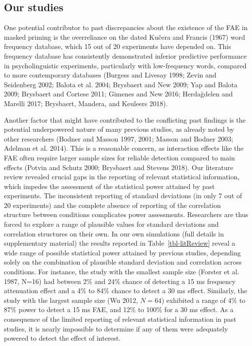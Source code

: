 \documentclass[
]{interact}
\begin{document}
\subsection{Our studies}\label{our-studies}

One potential contributor to past discrepancies about the existence of
the FAE in masked priming is the overreliance on the dated Kučera and
Francis (1967) word frequency database, which 15 out of 20 experiments
have depended on. This frequency database has consistently demonstrated
inferior predictive performance in psycholinguistic experiments,
particularly with low-frequency words, compared to more contemporary
databases (Burgess and Livesay 1998; Zevin and Seidenberg 2002; Balota
et al. 2004; Brysbaert and New 2009; Yap and Balota 2009; Brysbaert and
Cortese 2011; Gimenes and New 2016; Herdağdelen and Marelli 2017;
Brysbaert, Mandera, and Keuleers 2018).

Another factor that might have contributed to the conflicting past
findings is the potential underpowered nature of many previous studies,
as already noted by other researchers (Bodner and Masson 1997, 2001;
Masson and Bodner 2003; Adelman et al. 2014). This is a reasonable
concern, as interaction effects like the FAE often require larger sample
sizes for reliable detection compared to main effects (Potvin and Schutz
2000; Brysbaert and Stevens 2018). Our literature review revealed
crucial gaps in the reporting of relevant statistical information, which
impedes the assessment of the statistical power attained by past
experiments. The inconsistent reporting of standard deviations (in only
7 out of 20 experiments) and the complete absence of reporting of the
correlation structure between conditions complicates power assessments.
Researchers are thus forced to explore a range of plausible values for
standard deviations and correlation structures on their own. In our own
simulations (full details in supplementary material) the results
reported in Table~\ref{tbl-litReview} reveal a wide range of possible
statistical power attained by previous studies, depending solely on the
combination of plausible standard deviation and correlation across
conditions. For instance, the study with the smallest sample size
(Forster et al. 1987, N=16) had between 2\% and 24\% chance of detecting
a 15 ms frequency attenuation effect and a 4\% to 84\% chance to detect
a 30 ms effect. Similarly, the study with the largest sample size (Wu
2012, \(N=64\)) exhibited a range of 4\% to 87\% power to detect a 15 ms
FAE, and 12\% to 100\% for a 30 ms effect. As a consequence of the
limited reporting of relevant statistical information in past studies,
it is nearly impossible to determine if any of them were adequately
powered to detect the effect of interest.
\end{document}
